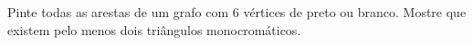 Pinte todas as arestas de um grafo com $6$ vértices de preto ou branco. Mostre que existem pelo menos dois triângulos monocromáticos.
